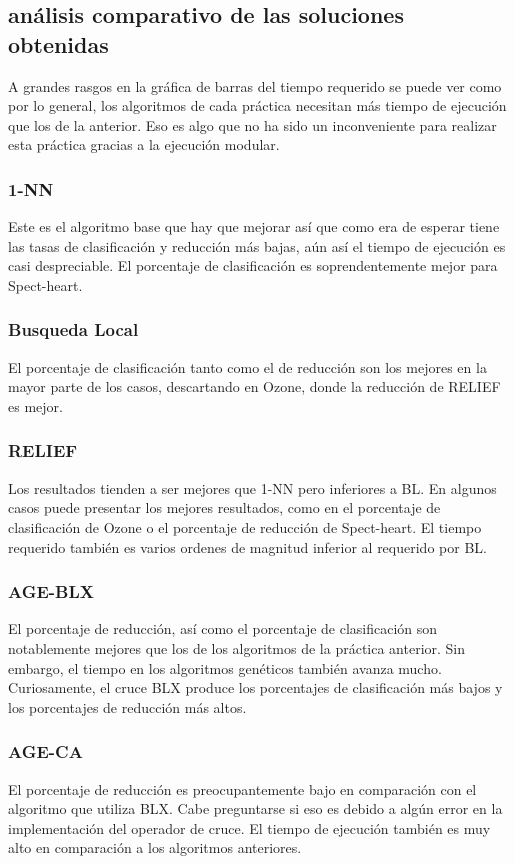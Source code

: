 \documentclass[12pt, spanish]{article}
\begin{document}
\subsection{análisis comparativo de las soluciones obtenidas}
A grandes rasgos en la gráfica de barras del tiempo requerido se puede ver como por lo general, los algoritmos de cada práctica necesitan más tiempo de ejecución que los de la anterior. Eso es algo que no ha sido un inconveniente para realizar esta práctica gracias a la ejecución modular. 
\subsubsection{1-NN}
Este es el algoritmo base que hay que mejorar así que como era de esperar tiene las tasas de clasificación y reducción más bajas, aún así el tiempo de ejecución es casi despreciable. El porcentaje de clasificación es soprendentemente mejor para Spect-heart.

\subsubsection{Busqueda Local}
El porcentaje de clasificación tanto como el de reducción son los mejores en la mayor parte de los casos, descartando en Ozone, donde la reducción de RELIEF es mejor. 

\subsubsection{RELIEF}
Los resultados tienden a ser mejores que 1-NN pero inferiores a BL. En algunos casos puede presentar los mejores resultados, como en el porcentaje de clasificación de Ozone o el porcentaje de reducción de Spect-heart. El tiempo requerido también es varios ordenes de magnitud inferior al requerido por BL. 

\subsubsection{AGE-BLX}
El porcentaje de reducción, así como el porcentaje de clasificación son notablemente mejores que los de los algoritmos de la práctica anterior. Sin embargo, el tiempo en los algoritmos genéticos también avanza mucho. \\
\newline
Curiosamente, el cruce BLX produce los porcentajes de clasificación más bajos y los porcentajes de reducción más altos. 
\subsubsection{AGE-CA}
El porcentaje de reducción es preocupantemente bajo en comparación con el algoritmo que utiliza BLX. Cabe preguntarse si eso es debido a algún error en la implementación del operador de cruce. El tiempo de ejecución también es muy alto en comparación a los algoritmos anteriores. 
\end{document}
